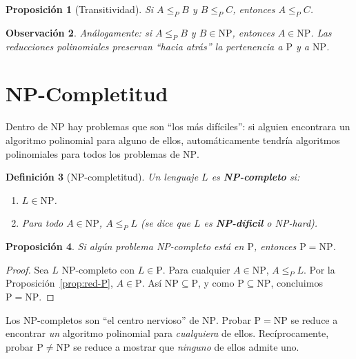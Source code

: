 \documentclass[11pt,a4paper]{article}
\theoremstyle{definicion}
\newtheorem{definicion}{Definici\'on}[section]
\newtheorem{proposicion}[definicion]{Proposici\'on}
\newtheorem{observacion}[definicion]{Observaci\'on}
\newcommand{\redP}{\leq_{P}}
\newcommand{\NP}{\mathrm{NP}}
\newcommand{\Pclass}{\mathrm{P}}
\begin{document}
\begin{proposicion}[Transitividad]
Si $A \redP B$ y $B \redP C$, entonces $A \redP C$.
\end{proposicion}

\begin{observacion}
An\'alogamente: si $A \redP B$ y $B \in \NP$, entonces $A \in \NP$. Las reducciones polinomiales preservan ``hacia atr\'as'' la pertenencia a $\Pclass$ y a $\NP$.
\end{observacion}

\section{NP-Completitud}

Dentro de $\NP$ hay problemas que son ``los m\'as dif\'iciles'': si alguien encontrara un algoritmo polinomial para alguno de ellos, autom\'aticamente tendr\'ia algoritmos polinomiales para todos los problemas de $\NP$.

\begin{definicion}[NP-completitud]
Un lenguaje $L$ es \textbf{NP-completo} si:
\begin{enumerate}
    \item $L \in \NP$.
    \item Para todo $A \in \NP$, $A \redP L$ (se dice que $L$ es \textbf{NP-d\'ificil} o \emph{NP-hard}).
\end{enumerate}
\end{definicion}

\begin{proposicion}\label{prop:np-completo-p}
Si alg\'un problema NP-completo est\'a en $\Pclass$, entonces $\Pclass = \NP$.
\end{proposicion}

\begin{proof}
Sea $L$ NP-completo con $L \in \Pclass$. Para cualquier $A \in \NP$, $A \redP L$. Por la Proposici\'on~\ref{prop:red-P}, $A \in \Pclass$. As\'i $\NP \subseteq \Pclass$, y como $\Pclass \subseteq \NP$, concluimos $\Pclass = \NP$.
\end{proof}

\begin{idea}
Los NP-completos son ``el centro nervioso'' de $\NP$. Probar $\Pclass = \NP$ se reduce a encontrar \emph{un} algoritmo polinomial para \emph{cualquiera} de ellos. Rec\'iprocamente, probar $\Pclass \neq \NP$ se reduce a mostrar que \emph{ninguno} de ellos admite uno.
\end{idea}
\end{document}
